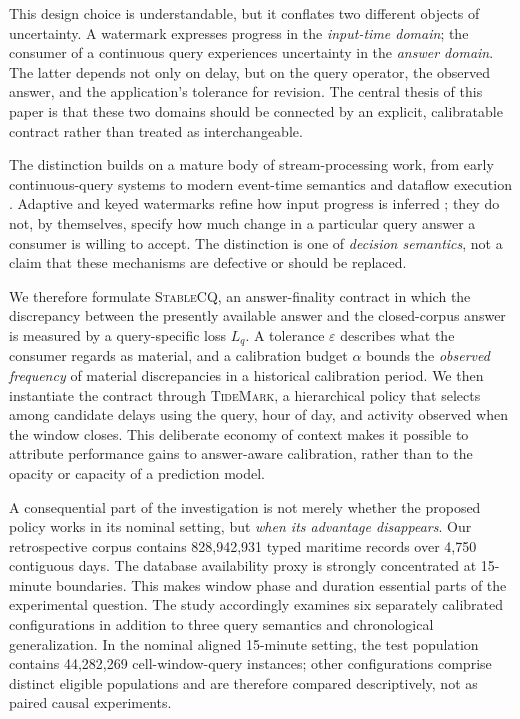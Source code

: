 \documentclass[conference]{IEEEtran}
\newcommand{\stablecq}{\textsc{StableCQ}}
\newcommand{\tidemark}{\textsc{TideMark}}
\newcommand{\eps}{\varepsilon}
\begin{document}
This design choice is understandable, but it conflates two different objects of uncertainty. A watermark expresses progress in the \emph{input-time domain}; the consumer of a continuous query experiences uncertainty in the \emph{answer domain}. The latter depends not only on delay, but on the query operator, the observed answer, and the application's tolerance for revision. The central thesis of this paper is that these two domains should be connected by an explicit, calibratable contract rather than treated as interchangeable.

The distinction builds on a mature body of stream-processing work, from early continuous-query systems \cite{babcock2002streams,abadi2003aurora,golab2003issues,abadi2005borealis,arasu2006cql} to modern event-time semantics and dataflow execution \cite{akidau2015dataflow,fragkoulis2024survey}. Adaptive and keyed watermarks refine how input progress is inferred \cite{awad2019adaptive,yasser2025keyed}; they do not, by themselves, specify how much change in a particular query answer a consumer is willing to accept. The distinction is one of \emph{decision semantics}, not a claim that these mechanisms are defective or should be replaced.

We therefore formulate \stablecq, an answer-finality contract in which the discrepancy between the presently available answer and the closed-corpus answer is measured by a query-specific loss $L_q$. A tolerance $\eps$ describes what the consumer regards as material, and a calibration budget $\alpha$ bounds the \emph{observed frequency} of material discrepancies in a historical calibration period. We then instantiate the contract through \tidemark, a hierarchical policy that selects among candidate delays using the query, hour of day, and activity observed when the window closes. This deliberate economy of context makes it possible to attribute performance gains to answer-aware calibration, rather than to the opacity or capacity of a prediction model.

A consequential part of the investigation is not merely whether the proposed policy works in its nominal setting, but \emph{when its advantage disappears}. Our retrospective corpus contains 828,942,931 typed maritime records over 4,750 contiguous days. The database availability proxy is strongly concentrated at 15-minute boundaries. This makes window phase and duration essential parts of the experimental question. The study accordingly examines six separately calibrated configurations in addition to three query semantics and chronological generalization. In the nominal aligned 15-minute setting, the test population contains 44,282,269 cell-window-query instances; other configurations comprise distinct eligible populations and are therefore compared descriptively, not as paired causal experiments.
\end{document}
